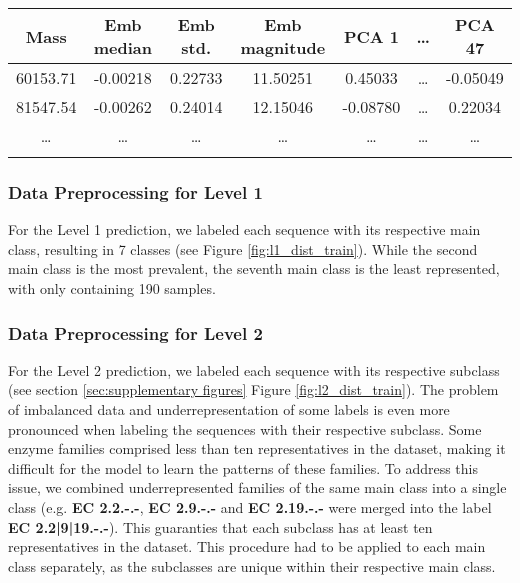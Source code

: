 \documentclass{bioinfo}
\begin{document}
\begin{methods}
\begin{table}[!htbp]
\setlength{\tabcolsep}{2pt}
 {
	\begin{tabular}{@{}ccccccc@{}}
		\toprule 
		Mass & Emb median & Emb std. & Emb magnitude & PCA 1 & \dots & PCA 47\\
		\midrule
		60153.71 & -0.00218 & 0.22733 & 11.50251 & 0.45033 & \dots & -0.05049\\
		81547.54 & -0.00262 & 0.24014 & 12.15046 & -0.08780 & \dots & 0.22034 \\
		\dots & \dots & \dots & \dots & \dots & \dots & \dots \\
		\botrule
    \end{tabular}
}{}
\end{table}

\subsubsection{Data Preprocessing for Level 1}
For the Level 1 prediction, we labeled each sequence with its respective main class,
resulting in 7 classes (see Figure \ref{fig:l1_dist_train}).
While the second main class is the most prevalent, 
the seventh main class is the least represented, with only
containing 190 samples. 



\subsubsection{Data Preprocessing for Level 2}
For the Level 2 prediction, we labeled each sequence with its respective subclass (see section \ref{sec:supplementary figures} Figure \ref{fig:l2_dist_train}).
The problem of imbalanced data and underrepresentation of some labels is even more pronounced when labeling the sequences with their respective subclass.
Some enzyme families comprised less than ten representatives in the dataset, making it difficult for the model to learn the patterns of these families.
To address this issue, we combined underrepresented families of the same main class into a single class 
(e.g. \textbf{EC 2.2.-.-}, \textbf{EC 2.9.-.-} and \textbf{EC 2.19.-.-} were merged into the label \textbf{EC 2.2|9|19.-.-}).
This guaranties that each subclass has at least ten representatives in the dataset.
This procedure had to be applied to each main class separately, as the subclasses are unique within their respective main class.


\end{methods}
\end{document}
